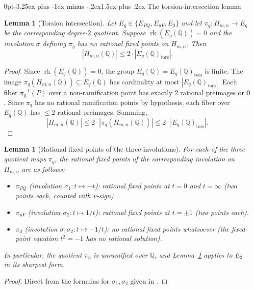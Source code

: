 \documentclass[12pt,a4paper,reqno]{amsart}
\makeatletter
\renewcommand{\subsection}{\@startsection{subsection}{2}%
  {0pt}{-3.25ex plus -1ex minus -.2ex}{1.5ex plus .2ex}%
  {\normalfont\normalsize\bfseries}}
\theoremstyle{plain}
\newtheorem{lemma}[theorem]{Lemma}
\theoremstyle{definition}
\theoremstyle{remark}
\newcommand{\Q}{\mathbb{Q}}
\newcommand{\HC}{H_{m,n}}
\newcommand{\rk}{\operatorname{rk}}
\newcommand{\tors}{\mathrm{tors}}
\makeatother
\begin{document}
\subsection{The torsion-intersection lemma}

\begin{lemma}[Torsion intersection]
\label{lem:tors-intersect}
Let $E_q \in \{E_{PQ}, E_{uV}, E_3\}$ and let $\pi_q: \HC \to E_q$ be the corresponding degree-$2$ quotient. Suppose $\rk(E_q(\Q)) = 0$ and the involution $\sigma$ defining $\pi_q$ has no rational fixed points on $\HC$. Then
$$
|\HC(\Q)| \le 2 \cdot |E_q(\Q)_\tors|.
$$
\end{lemma}

\begin{proof}
Since $\rk(E_q(\Q)) = 0$, the group $E_q(\Q) = E_q(\Q)_\tors$ is finite. The image $\pi_q(\HC(\Q)) \subseteq E_q(\Q)$ has cardinality at most $|E_q(\Q)_\tors|$. Each fiber $\pi_q^{-1}(P)$ over a non-ramification point has exactly $2$ rational preimages or $0$. Since $\pi_q$ has no rational ramification points by hypothesis, each fiber over $E_q(\Q)$ has $\le 2$ rational preimages. Summing,
$$
|\HC(\Q)| \le 2 \cdot |\pi_q(\HC(\Q))| \le 2 \cdot |E_q(\Q)_\tors|.
$$
\end{proof}

\begin{lemma}[Rational fixed points of the three involutions]
\label{lem:no-ram}
For each of the three quotient maps $\pi_q$, the rational fixed points of
the corresponding involution on $\HC$ are as follows:
\begin{itemize}[leftmargin=2em]
    \item $\pi_{PQ}$ (involution $\sigma_1: t \mapsto -t$): rational fixed
      points at $t = 0$ and $t = \infty$ (two points each, counted with
      $v$-sign).
    \item $\pi_{uV}$ (involution $\sigma_2: t \mapsto 1/t$): rational fixed
      points at $t = \pm 1$ (two points each).
    \item $\pi_3$ (involution $\sigma_1 \sigma_2: t \mapsto -1/t$):
      \emph{no} rational fixed points whatsoever (the fixed-point equation
      $t^2 = -1$ has no rational solution).
\end{itemize}
In particular, the quotient $\pi_3$ is unramified over $\Q$, and Lemma~\ref{lem:tors-intersect} applies to $E_3$ in its sharpest form.
\end{lemma}

\begin{proof}
Direct from the formulas for $\sigma_1, \sigma_2$ given in \cite[\S 4.1]{peschmann-paper1}.
\end{proof}
\end{document}

